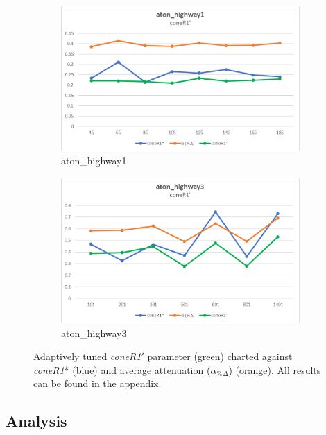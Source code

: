 \begin{figure}
  \centering
  \begin{subfigure}{.8\linewidth}
  \includegraphics[width=1\linewidth]{figures/model/highway1_calc_coneR1.jpg}
  \caption{aton\_highway1}
\end{subfigure}
\hfill
\begin{subfigure}{.8\linewidth}
  \includegraphics[width=1\linewidth]{figures/model/highway3_calc_coneR1.jpg}
  \caption{aton\_highway3}
\end{subfigure}

\caption{Adaptively tuned \textit{coneR1}$'$ parameter (green) charted against \textit{coneR1}* (blue) and average attenuation ($\alpha_{\%\Delta}$) (orange). All results can be found in the appendix.}
\label{fig:new_coneR1}
\end{figure}

\subsection{Analysis}

